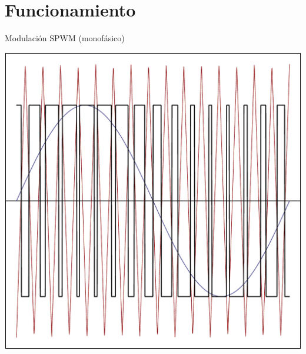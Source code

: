 \documentclass[aspectratio=169, usenames,svgnames,dvipsnames]{beamer}
\begin{document}
\section{Funcionamiento}
\label{sec:orgaa5b33a}

\begin{frame}[label={sec:orgafe8cab}]{Modulación SPWM (monofásico)}
\begin{center}
\includegraphics[height=0.9\textheight]{../figs/SPWMMonofasico.pdf}
\end{center}
\end{frame}
\end{document}
